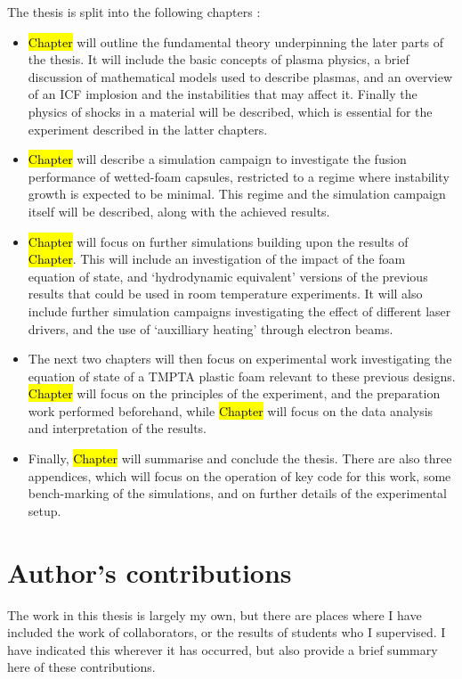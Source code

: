 The thesis is split into the following chapters :
\begin{itemize}
	\item \hl{Chapter} will outline the fundamental theory underpinning the later parts of the thesis. It will include the basic concepts of plasma physics, a brief discussion of mathematical models used to describe plasmas, and an overview of an ICF implosion and the instabilities that may affect it. Finally the physics of shocks in a material will be described, which is essential for the experiment described in the latter chapters.
	\item \hl{Chapter} will describe a simulation campaign to investigate the fusion performance of wetted-foam capsules, restricted to a regime where instability growth is expected to be minimal. This regime and the simulation campaign itself will be described, along with the achieved results.
	\item \hl{Chapter} will focus on further simulations building upon the results of \hl{Chapter}. This will include an investigation of the impact of the foam equation of state, and `hydrodynamic equivalent' versions of the previous results that could be used in room temperature experiments. It will also include further simulation campaigns investigating the effect of different laser drivers, and the use of `auxilliary heating' through electron beams.
	\item The next two chapters will then focus on experimental work investigating the equation of state of a TMPTA plastic foam relevant to these previous designs. \hl{Chapter} will focus on the principles of the experiment, and the preparation work performed beforehand, while \hl{Chapter} will focus on the data analysis and interpretation of the results.
	\item Finally, \hl{Chapter} will summarise and conclude the thesis. There are also three appendices, which will focus on the operation of key code for this work, some bench-marking of the simulations, and on further details of the experimental setup.
\end{itemize}

\section{Author's contributions}

The work in this thesis is largely my own, but there are places where I have included the work of collaborators, or the results of students who I supervised. I have indicated this wherever it has occurred, but also provide a brief summary here of these contributions.

